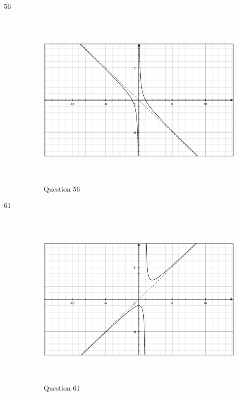 \documentclass[fleqn,addpoints]{exam}
\begin{document}
\begin{description}
\item[56]
\begin{figure}[H]
  \centering
  \includegraphics[width=12.25cm,height=8.75cm]{question56.eps}
  \caption*{Question 56}
\end{figure}

\item[61]
\begin{figure}[H]
  \centering
  \includegraphics[width=12.25cm,height=8.75cm]{question61.eps}
  \caption*{Question 61}
\end{figure}


\end{description}
\end{document}
